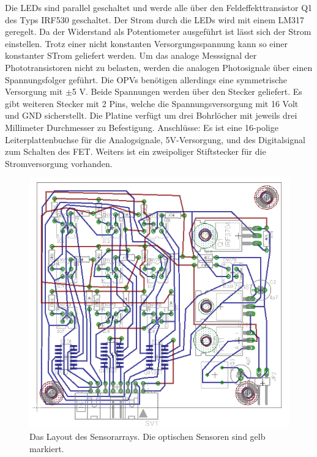 \documentclass[a4paper,bibtotoc,oneside]{scrbook}
\begin{document}
Die LEDs sind parallel geschaltet und werde alle über den Feldeffekttransistor Q1 des Typs IRF530 geschaltet.
Der Strom durch die LEDs wird mit einem LM317 geregelt. Da der Widerstand als Potentiometer ausgeführt ist lässt sich der Strom einstellen. Trotz einer nicht konstanten Versorgungsspannung kann so einer konstanter STrom geliefert werden. Um das analoge Messsignal der Phototransistoren nicht zu belasten, werden die analogen Photosignale über einen Spannungsfolger geführt. Die OPVs benötigen allerdings eine symmetrische Versorgung mit $\pm$5 V. Beide Spannungen werden über den Stecker geliefert.
Es gibt weiteren Stecker mit 2 Pins, welche die Spannungsversorgung mit 16 Volt und GND sicherstellt. 
Die Platine verfügt um drei Bohrlöcher mit jeweils drei Millimeter Durchmesser zu Befestigung.
Anschlüsse: Es ist eine 16-polige Leiterplattenbuchse für die Analogsignale, 5V-Versorgung, und des Digitalsignal zum Schalten des FET.  Weiters ist ein zweipoliger Stiftstecker für die Stromversorgung vorhanden.
\begin{figure}[htbp]
\centering
\includegraphics[width=125mm]{img/array2.png}
\caption{Das Layout des Sensorarrays. Die optischen Sensoren sind gelb markiert.}\label{array2}
\end{figure}
\end{document}
